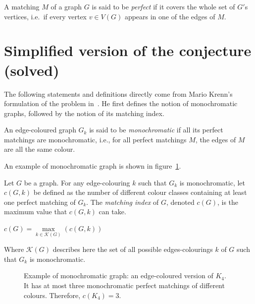 \begin{definition}
    \label{def:perfect_matching}
    A matching $M$ of a graph $G$ is said to be \textit{perfect} if it covers the whole set of $G'$s vertices, i.e.\ if every vertex $v \in V(G)$ appears in one of the edges of $M$.
\end{definition}


\section{Simplified version of the conjecture (solved)}
\label{sec:simplified-version-of-the-conjecture}

The following statements and definitions directly come from Mario Krenn's formulation of the problem in~\cite{wordpress}.
He first defines the notion of monochromatic graphs, followed by the notion of its matching index.

\begin{definition}
    \label{def:monochromatic_graph}
    An edge-coloured graph $G_k$ is said to be \textit{monochromatic} if all its perfect matchings are monochromatic, i.e., for all perfect matchings $M$, the edges of $M$ are all the same colour.
\end{definition}

An example of monochromatic graph is shown in figure~\ref{fig:k4_pm}.

\begin{definition}
    \label{def:matching_index}
    Let $G$ be a graph.
    For any edge-colouring $k$ such that $G_k$ is monochromatic, let $c(G, k)$ be defined as the number of different colour classes containing at least one perfect matching of $G_k$.
    The \textit{matching index} of $G$, denoted $c(G)$, is the maximum value that $c(G, k)$ can take.
    \begin{center}
        $c(G) = \max\limits_{k \in \mathcal{K}(G)}(c(G, k))$
    \end{center}
    Where $\mathcal{K}(G)$ describes here the set of all possible edges-colourings $k$ of $G$ such that $G_{k}$ is monochromatic.
\end{definition}

\begin{figure}[H]
    \caption{Example of monochromatic graph: an edge-coloured version of $K_4$. It has at most three monochromatic perfect matchings of different colours.
        Therefore, $c(K_4) = 3$.}
    \label{fig:k4_pm}
\end{figure}

